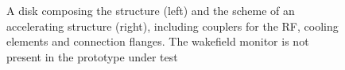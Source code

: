  \begin{figure}[h]
 \centering
 \hspace{5mm}
 \caption{A disk composing the structure (left) and the scheme of an accelerating structure (right), including couplers for the RF, cooling elements and connection flanges. The wakefield monitor is not present in the prototype under test}
 \label{CLICdisk}
 
 \end{figure}
 

